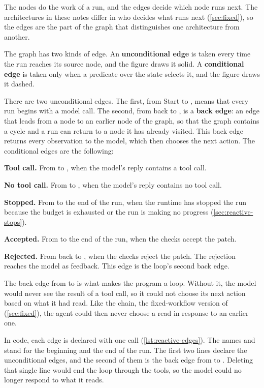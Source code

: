 The nodes do the work of a run, and the edges decide which node runs next. The architectures in
these notes differ in who decides what runs next (\cref{sec:fixed}), so the edges are the part of the
graph that distinguishes one architecture from another.

The graph has two kinds of edge. An \textbf{unconditional edge} is taken every time the run reaches
its source node, and the figure draws it solid. A \textbf{conditional edge} is taken only when a
predicate over the state selects it, and the figure draws it dashed.

There are two unconditional edges. The first, from Start to , means that every
run begins with a model call. The second, from  back to , is a
\textbf{back edge}: an edge that leads from a node to an earlier node of the graph, so that the
graph contains a cycle and a run can return to a node it has already visited. This back edge
returns every observation to the model, which then chooses the next action. The conditional edges
are the following:
\bi
\item \textbf{Tool call.} From  to , when the model's reply
contains a tool call.
\item \textbf{No tool call.} From  to , when the model's reply
contains no tool call.
\item \textbf{Stopped.} From  to the end of the run, when the runtime has
stopped the run because the budget is exhausted or the run is making no progress
(\cref{sec:reactive-stops}).
\item \textbf{Accepted.} From  to the end of the run, when the checks accept the
patch.
\item \textbf{Rejected.} From  back to , when the checks reject
the patch. The rejection reaches the model as feedback. This edge is the loop's second back edge.
\ei

The back edge from  to  is what makes the program a loop. Without it, the model would never see the result of
a tool call, so it could not choose its next action based on what it had read. Like the chain, the
fixed-workflow version of \msa{} (\cref{sec:fixed}), the agent could then never choose a read in
response to an earlier one.

In code, each edge is declared with one call (\cref{lst:reactive-edges}). The names
 and  stand for the beginning and the end of the run. The first two
lines declare the unconditional edges, and the second of them is the back edge from 
to . Deleting that single line would end the loop through the tools, so the
model could no longer respond to what it reads.

